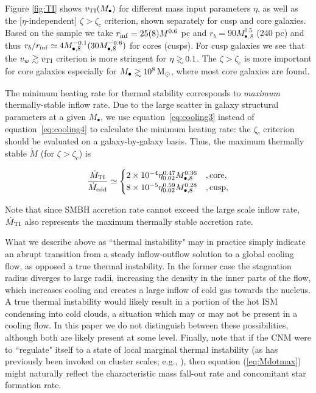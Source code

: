 \documentclass[usenatbib,fleqn]{mn2e}
\newcommand{\Mdot}{\dot{M}}
\newcommand\gsim{\mathrel{\rlap{\lower4pt\hbox{\hskip1pt$\sim$}}
    \raise1pt\hbox{$>$}}}
\newcommand{\rb}{r_b}
\newcommand{\Mbh}[1][]{M_{\bullet#1}}
\newcommand{\Mbheight}{M_{\bullet,8}}
\newcommand{\rinf}{r_{\rm inf}}
\begin{document}
Figure \ref{fig:TI} shows $v_{\rm TI}(M_{\bullet})$ for different mass
input parameters $\eta$, as well as the [$\eta$-independent] $\zeta >
\zeta_c$ criterion, shown separately for cusp and core galaxies.
Based on the \citet{LauerFaber+:2007a} sample we take $\rinf = 25(8)M
^{0.6}$ pc and $\rb = 90 \Mbheight^{0.5}$ (240 pc) and thus
$\rb/\rinf\simeq 4 \Mbheight^{-0.1} (30 \Mbheight^{-0.6})$ for cores
(cusps).  For cusp galaxies we see that the $v_w \gtrsim v_{\rm TI}$
criterion is more stringent for $\eta \gsim 0.1$. The $\zeta >
\zeta_c$ is more important for core galaxies especially for $\Mbh
\gsim 10^8 \Msun$, where most core galaxies are found. 

The minimum heating rate for thermal stability corresponds to {\it
  maximum} thermally-stable inflow rate. Due to the large scatter
in galaxy structural parameters at a given $\Mbh$, we use
equation~\eqref{eq:cooling3} instead of equation~\eqref{eq:cooling4}
to calculate the minimum heating rate: the $\zeta_c$ criterion should
be evaluated on a galaxy-by-galaxy basis. Thus, the maximum thermally
stable $\Mdot$ (for $\zeta>\zeta_c$) is

\begin{align}
  \frac{\dot{M}_{\rm TI}}{\dot{M}_{\rm edd}} \simeq \begin{cases}
    2\times 10^{-4}\eta_{0.02}^{0.47}M_{\bullet,8}^{0.36} &, \text{core}, \\
    8\times 10^{-5} \eta_{0.02}^{0.59} M_{\bullet,8}^{0.28}    &, \text{cusp},\\
  \end{cases}
  \label{eq:Mdotmax}
\end{align}

Note that since SMBH accretion rate cannot exceed the large scale
inflow rate, $\dot{M}_{\rm TI}$ also represents the maximum thermally
stable accretion rate.

What we describe above as ``thermal instability" may in practice
simply indicate an abrupt transition from a steady inflow-outflow
solution to a global cooling flow, as opposed a true thermal
instability.  In the former case the stagnation radius diverges to
large radii, increasing the density in the inner parts of the flow,
which increases cooling and creates a large inflow of cold gas towards
the nucleus.  A true thermal instability would likely result in a
portion of the hot ISM condensing into cold clouds, a situation which
may or may not be present in a cooling flow.  In this paper we do not
distinguish between these possibilities, although both are likely
present at some level.  Finally, note that if the CNM were to
``regulate" itself to a state of local marginal thermal instability
(as has previously been invoked on cluster scales; e.g.,
\citealt{Voit+15}), then equation (\ref{eq:Mdotmax}) might naturally
reflect the characteristic mass fall-out rate and concomitant star
formation rate.
\end{document}
